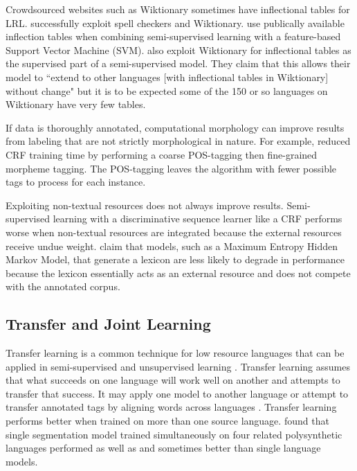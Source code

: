\documentclass[12pt]{article}
\begin{document}
Crowdsourced websites such as Wiktionary sometimes have inflectional tables for LRL.  successfully exploit spell checkers and Wiktionary.  use publically available inflection tables when combining semi-supervised learning with a feature-based Support Vector Machine (SVM).  also exploit Wiktionary for inflectional tables as the supervised part of a semi-supervised model. They claim that this allows their model to ``extend to other languages [with inflectional tables in Wiktionary] without change" but it is to be expected some of the 150 or so languages on Wiktionary have very few tables. 

If data is thoroughly annotated, computational morphology can improve results from labeling that are not strictly morphological in nature. For example,  reduced CRF training time by performing a coarse POS-tagging then fine-grained morpheme tagging. The POS-tagging leaves the algorithm with fewer possible tags to process for each instance. 

Exploiting non-textual resources does not always improve results. Semi-supervised learning with a discriminative sequence learner like a CRF performs worse when non-textual resources are integrated because the external resources receive undue weight.  claim that models, such as a Maximum Entropy Hidden Markov Model, that generate a lexicon are less likely to degrade in performance because the lexicon essentially acts as an external resource and does not compete with the annotated corpus. 

\subsection{Transfer and Joint Learning}
\label{transfer}

Transfer learning is a common technique for low resource languages that can be applied in semi-supervised and unsupervised learning \cite{duong_natural_2017}. Transfer learning assumes that what succeeds on one language will work well on another and attempts to transfer that success. It may apply one model to another language or attempt to transfer annotated tags by aligning words across languages \cite{duong_natural_2017}. Transfer learning performs better when trained on more than one source language.  found that single segmentation model trained simultaneously on four related polysynthetic languages performed as well as and sometimes better than single language models.
\end{document}
